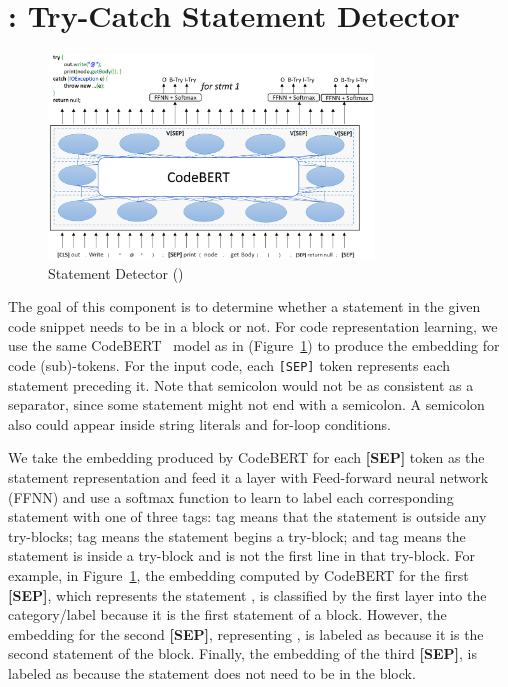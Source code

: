 \section{{\xstate}: Try-Catch Statement Detector}
\label{sec:xstate}

\begin{figure}[t]
 	\centering
 	\includegraphics[width=3.4in]{xstate.png}
        \vspace{-20pt}
 	\caption{ Statement Detector ({\xstate})}
 	\label{fig:xstate}	
\end{figure}

The goal of this component is to determine whether a statement in the
given code snippet needs to be in a  block or not.
For code representation learning, we use the same
CodeBERT~\cite{codebert-emnlp20} model as in {\xblock}
(Figure~\ref{fig:xstate}) to produce the embedding for code
(sub)-tokens. For the input code, each \texttt{[SEP]} token represents
each statement preceding it. Note that semicolon would not be as
consistent as a separator, since some statement might not end with a
semicolon. A semicolon also could appear inside string literals and
for-loop conditions.

We take the embedding produced by CodeBERT for each {\bf [SEP]} token
as the statement representation and feed it a layer with Feed-forward
neural network (FFNN) and use a softmax function to learn to label
each corresponding statement with one of three tags:  tag
means that the statement is outside any try-blocks;  tag
means the statement begins a try-block; and  tag means the
statement is inside a try-block and is not the first line in that
try-block. For example, in Figure~\ref{fig:xstate}, the embedding
computed by CodeBERT for the first {\bf [SEP]}, which represents the
statement , is classified by the first
 layer into the  category/label because
it is the first statement of a  block. However, the
embedding for the second {\bf [SEP]}, representing
, is labeled as  because it
is the second statement of the  block. Finally, the
embedding of the third {\bf [SEP]}, is labeled as  because the
statement  does not need to be in the
 block.

